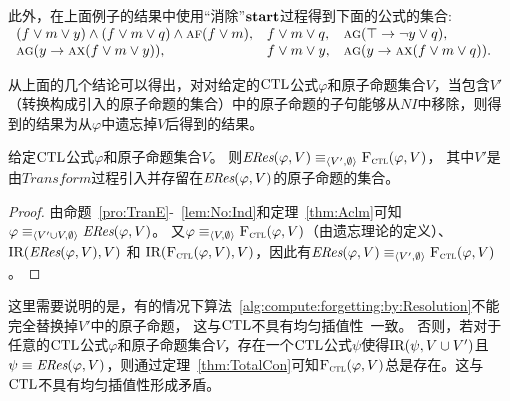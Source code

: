 此外，在上面例子的结果中使用“消除”$\textbf{start}$过程得到下面的公式的集合:\\
$\begin{array}{lll}
	(f \vee m \vee y) \wedge (f \vee m\vee q) \wedge \textsc{a} \textsc{f} (f \vee m), &
	f\vee m \vee q, &
	\textsc{a}\textsc{g}(\top \rightarrow \neg y \vee q), \\
	\textsc{a}\textsc{g}(y \rightarrow \textsc{a} \textsc{x}(f \vee m \vee y)), &
	f \vee m \vee y, & 
	\textsc{a}\textsc{g}(y \rightarrow \textsc{a}\textsc{x}(f \vee m\vee q)).
\end{array}
$

从上面的几个结论可以得出，对对给定的$\textrm{CTL}$公式$\varphi$和原子命题集合$V$，当包含$V'$（转换构成引入的原子命题的集合）中的原子命题的子句能够从$NI$中移除，则得到的结果为从$\varphi$中遗忘掉$V$后得到的结果。

\begin{theorem}\label{thm:TotalCon}
	给定$\textrm{CTL}$公式$\varphi$和原子命题集合$V$。
	则$\emph{ERes}(\varphi,V)\equiv_{{\langle{V',\emptyset}\rangle}} {\textsc{F}_{\textsc{ctl}}}(\varphi,V)$，
	其中$V'$是由$Transform$过程引入并存留在$\emph{ERes}(\varphi,V)$的原子命题的集合。
\end{theorem}
\begin{proof}
	由命题~\ref{pro:TranE}-~\ref{lem:No:Ind}和定理~\ref{thm:Aclm}可知$\varphi \equiv_{{\langle{V'\cup V, \emptyset}\rangle}} \emph{ERes}(\varphi,V)$。
	又$\varphi \equiv_{{\langle{V,\emptyset}\rangle}} {\textsc{F}_{\textsc{ctl}}}(\varphi,V)$（由遗忘理论的定义）、$\textrm{IR}(\emph{ERes}(\varphi,V), V)$ 和 $\textrm{IR}({\textsc{F}_{\textsc{ctl}}}(\varphi,V), V)$，因此有$\emph{ERes}(\varphi,V)\equiv_{{\langle{V',\emptyset}\rangle}} {\textsc{F}_{\textsc{ctl}}}(\varphi,V)$。
\end{proof}

这里需要说明的是，有的情况下算法~\ref{alg:compute:forgetting:by:Resolution}不能完全替换掉$V'$中的原子命题，
这与$\textrm{CTL}$不具有均匀插值性~\cite{Maksimova:JANCL:1991}一致。
否则，若对于任意的$\textrm{CTL}$公式$\varphi$和原子命题集合$V$，存在一个$\textrm{CTL}$公式$\psi$使得$\textrm{IR}(\psi, V\cup V')$且$\psi \equiv \emph{ERes}(\varphi,V)$，则通过定理~\ref{thm:TotalCon}可知${\textsc{F}_{\textsc{ctl}}}(\varphi,V)$总是存在。这与$\textrm{CTL}$不具有均匀插值性形成矛盾。

